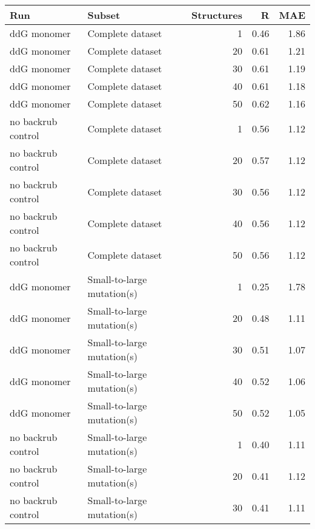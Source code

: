 \begin{table}
\begin{tabular}{llrrr}
\toprule
                Run &                               Subset &  Structures &    R &  MAE \\
\midrule
        ddG monomer &                     Complete dataset &           1 & 0.46 & 1.86 \\
        ddG monomer &                     Complete dataset &          20 & 0.61 & 1.21 \\
        ddG monomer &                     Complete dataset &          30 & 0.61 & 1.19 \\
        ddG monomer &                     Complete dataset &          40 & 0.61 & 1.18 \\
        ddG monomer &                     Complete dataset &          50 & 0.62 & 1.16 \\
 no backrub control &                     Complete dataset &           1 & 0.56 & 1.12 \\
 no backrub control &                     Complete dataset &          20 & 0.57 & 1.12 \\
 no backrub control &                     Complete dataset &          30 & 0.56 & 1.12 \\
 no backrub control &                     Complete dataset &          40 & 0.56 & 1.12 \\
 no backrub control &                     Complete dataset &          50 & 0.56 & 1.12 \\
        ddG monomer &           Small-to-large mutation(s) &           1 & 0.25 & 1.78 \\
        ddG monomer &           Small-to-large mutation(s) &          20 & 0.48 & 1.11 \\
        ddG monomer &           Small-to-large mutation(s) &          30 & 0.51 & 1.07 \\
        ddG monomer &           Small-to-large mutation(s) &          40 & 0.52 & 1.06 \\
        ddG monomer &           Small-to-large mutation(s) &          50 & 0.52 & 1.05 \\
 no backrub control &           Small-to-large mutation(s) &           1 & 0.40 & 1.11 \\
 no backrub control &           Small-to-large mutation(s) &          20 & 0.41 & 1.12 \\
 no backrub control &           Small-to-large mutation(s) &          30 & 0.41 & 1.11 \\

\end{tabular}
\end{table}
